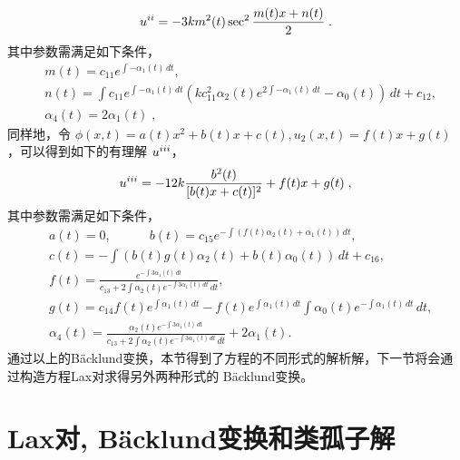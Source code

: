 \begin{equation}
u^{\uppercase\expandafter{\romannumeral 2}}=-3 k m^2(t) \sec ^2
\frac{m(t) x +n(t)}{2}
 \; .  \label{BT-p6}
\end{equation}
其中参数需满足如下条件，
\begin{align}
& m(t)=c_{11} e^{\int -\alpha _1(t) \, dt},
 \label{BT-p3}\\
& n(t)=\int c_{11} e^{\int -\alpha _1(t) \, dt} \left(k c_{11}^2 \alpha _2(t)
e^{2 \int -\alpha _1(t) \, dt}-\alpha _0(t)\right) \, dt+c_{12} ,
 \label{BT-p4}\\
& \alpha _4(t)=2 \alpha _1(t)
 \;  , \label{BT-p5}
\end{align}
同样地，令 $\phi(x,t)=a(t)x^2 +b(t)x +c(t), u_2(x,t)=f(t)x+g(t)$ ，可以得到如下的有理解 $u^{\uppercase\expandafter{\romannumeral 3}}$，
\begin{equation}
u^{\uppercase\expandafter{\romannumeral 3}} =-12k \frac{b^2(t)}{[b(t)x+c(t)]^2}+f(t)x+g(t)
 \; ,  \label{BT-r9}
\end{equation}
其中参数需满足如下条件，
\begin{align}
& a(t)=0,\quad\quad\quad
 b(t)=c_{15}  e^{-\int \left(f(t) \alpha _2(t)+\alpha _1(t)\right) \, dt} ,
 \label{BT-r4}\\
& c(t)=-\int \left(b(t) g(t) \alpha _2(t)+b(t) \alpha _0(t)\right) \, dt+c_{16} ,
 \label{BT-r5}\\
& f(t)=\frac{e^{-\int 3 \alpha _1(t) \, dt}}
{c_{13}+2 \int \alpha _2(t) e^{-\int 3 \alpha _1(t) \, dt} \, dt},
 \label{BT-r6}\\
& g(t)=c_{14} f(t) e^{\int \alpha _1(t) \, dt}-f(t) e^{\int \alpha _1(t) \, dt}
\int \alpha _0(t) e^{-\int \alpha _1(t) \, dt} \, dt ,
 \label{BT-r7}\\
& \alpha _4(t)=\frac{\alpha _2(t)e^{-\int 3 \alpha _1(t)  \, dt}}
{c_{13}+2  \int{ \alpha _2(t) e^{-\int {3 \alpha _1(t) } \, dt} \, dt}}+2 \alpha _1(t).  \label{BT-r8}
\end{align}
通过以上的B\"{a}cklund变换，本节得到了方程的不同形式的解析解，下一节将会通过构造方程Lax对求得另外两种形式的
B\"{a}cklund变换。


\section{Lax对, B\"{a}cklund变换和类孤子解}
